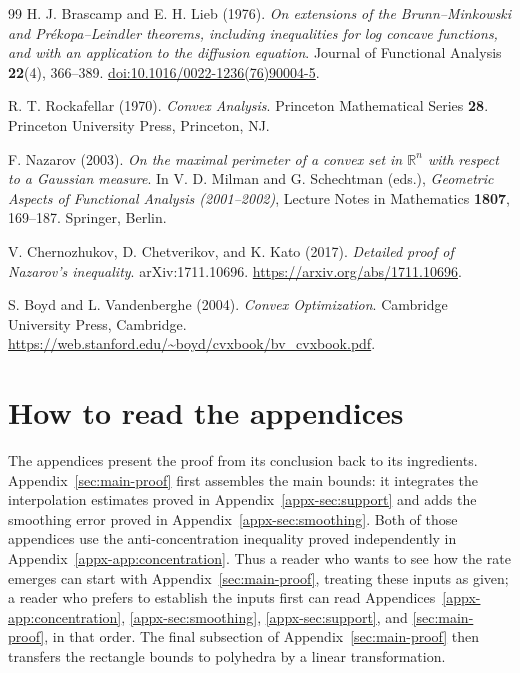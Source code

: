 \documentclass[11pt,letterpaper]{article}
\theoremstyle{remark}
\newcommand{\R}{\mathbb R}
\begin{document}
\begin{thebibliography}{99}
H. J. Brascamp and E. H. Lieb (1976).
\emph{On extensions of the Brunn--Minkowski and Pr\'ekopa--Leindler
theorems, including inequalities for log concave functions, and with
an application to the diffusion equation}.
Journal of Functional Analysis \textbf{22}(4), 366--389.
\href{https://doi.org/10.1016/0022-1236(76)90004-5}{doi:10.1016/0022-1236(76)90004-5}.

R. T. Rockafellar (1970).
\emph{Convex Analysis}.
Princeton Mathematical Series \textbf{28}.
Princeton University Press, Princeton, NJ.

F. Nazarov (2003).
\emph{On the maximal perimeter of a convex set in \(\R^n\)
with respect to a Gaussian measure}.
In V. D. Milman and G. Schechtman (eds.),
\emph{Geometric Aspects of Functional Analysis (2001--2002)},
Lecture Notes in Mathematics \textbf{1807}, 169--187.
Springer, Berlin.

V. Chernozhukov, D. Chetverikov, and K. Kato (2017).
\emph{Detailed proof of Nazarov's inequality}.
arXiv:1711.10696.
\url{https://arxiv.org/abs/1711.10696}.

S. Boyd and L. Vandenberghe (2004).
\emph{Convex Optimization}.
Cambridge University Press, Cambridge.
\url{https://web.stanford.edu/~boyd/cvxbook/bv_cvxbook.pdf}.

\end{thebibliography}

\clearpage
\appendix
{}

\section*{How to read the appendices}
The appendices present the proof from its conclusion back to its
ingredients. Appendix~\ref{sec:main-proof} first assembles the main
bounds: it integrates the interpolation estimates proved in
Appendix~\ref{appx-sec:support} and adds the smoothing error proved in
Appendix~\ref{appx-sec:smoothing}. Both of those appendices use the
anti-concentration inequality proved independently in
Appendix~\ref{appx-app:concentration}. Thus a reader who wants to see
how the rate emerges can start with Appendix~\ref{sec:main-proof},
treating these inputs as given; a reader who prefers to establish the
inputs first can read Appendices~\ref{appx-app:concentration},
\ref{appx-sec:smoothing}, \ref{appx-sec:support}, and
\ref{sec:main-proof}, in that order. The final subsection of
Appendix~\ref{sec:main-proof} then transfers the rectangle bounds
to polyhedra by a linear transformation.
\end{document}
